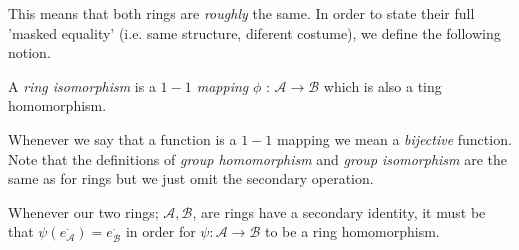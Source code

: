 \newpage

This means that both rings are \textit{roughly} the same. In order to state their full 'masked equality' (i.e. same structure, diferent costume), we define the following notion.

\vspace{0.3cm}

\begin{definition}
    A \textit{ring isomorphism} is a \textit{$1-1$ mapping} $\phi \text{ : } \mathcal{A} \rightarrow \mathcal{B}$ which is also a ting homomorphism.
\end{definition}

\vspace{0.3cm}

Whenever we say that a function is a $1-1$ mapping we mean a \textit{bijective} function. Note that the definitions of \textit{group homomorphism} and \textit{group isomorphism} are the same as for rings
but we just omit the secondary operation.

\vspace{0.3cm}

\begin{remark}
    Whenever our two rings; $\mathcal{A}, \mathcal{B}$, are rings have a secondary identity, it must be that $\psi(e^{\cdot}_{\mathcal{A}}) = e^{\cdot}_{\mathcal{B}}$ in order for $\psi: \mathcal{A} \rightarrow \mathcal{B}$ to be a ring homomorphism.
\end{remark}